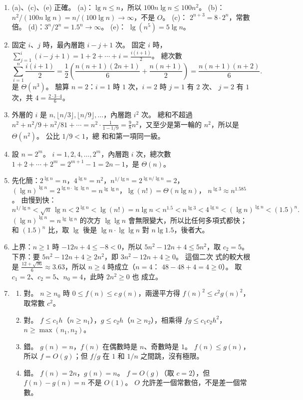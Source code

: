 \begin{enumerate}
\item (a)、(c)、(e) 正確。 (a)：$\lg n \le n$，所以 $100n\lg n \le 100n^2$。
(b)：$n^2 / (100 n \lg n) = n / (100 \lg n) \to \infty$，不是 $O$。 (c)：
$2^{n+3} = 8 \cdot 2^n$，常數倍。 (d)：$3^n / 2^n = 1.5^n \to \infty$。 (e)：
$\lg(n^5) = 5\lg n$。

\item 固定 $i$、$j$ 時，最內層跑 $i - j + 1$ 次。 固定 $i$ 時，
$\sum_{j=1}^{i} (i - j + 1) = 1 + 2 + \cdots + i = \frac{i(i+1)}{2}$。 總次數
\[
\sum_{i=1}^{n} \frac{i(i+1)}{2}
= \frac{1}{2}\left(\frac{n(n+1)(2n+1)}{6} + \frac{n(n+1)}{2}\right)
= \frac{n(n+1)(n+2)}{6}.
\]
是 $\Theta(n^3)$。 驗算 $n = 2$：$i = 1$ 時 $1$ 次，$i = 2$ 時 $j = 1$ 有 $2$ 次、
$j = 2$ 有 $1$ 次，共 $4 = \frac{2 \cdot 3 \cdot 4}{6}$。

\item 外層的 $i$ 是 $n, \lfloor n/3 \rfloor, \lfloor n/9 \rfloor, \ldots$，內層跑
$i^2$ 次。 總和不超過 $n^2 + n^2/9 + n^2/81 + \cdots = n^2 \cdot \frac{1}{1 - 1/9} =
\frac{9}{8}n^2$，又至少是第一輪的 $n^2$，所以是 $\Theta(n^2)$。 公比 $1/9 < 1$，總
和和第一項同一級。

\item 設 $n = 2^m$。 $i = 1, 2, 4, \ldots, 2^m$，內層跑 $i$ 次，總次數
$1 + 2 + \cdots + 2^m = 2^{m+1} - 1 = 2n - 1$，是 $\Theta(n)$。

\item 先化簡：$2^{\lg n} = n$，$4^{\lg n} = n^2$，$n^{1/\lg n} = 2^{\lg n / \lg n} = 2$，
$(\lg n)^{\lg n} = 2^{\lg n \cdot \lg\lg n} = n^{\lg \lg n}$，$\lg(n!) = \Theta(n \lg n)$，
$n^{\lg 3} \approx n^{1.585}$。 由慢到快：
\[
n^{1/\lg n} < \sqrt{n}\,\lg n < 2^{\lg n} < \lg(n!) = n\lg n < n^{1.5} < n^{\lg 3}
< 4^{\lg n} < (\lg n)^{\lg n} < (1.5)^n.
\]
$(\lg n)^{\lg n} = n^{\lg\lg n}$ 的次方 $\lg \lg n$ 會無限變大，所以比任何多項式都快；
和 $(1.5)^n$ 比，取 $\lg$ 後是 $\lg n \cdot \lg \lg n$ 對 $n \lg 1.5$，後者大。

\item 上界：$n \ge 1$ 時 $-12n + 4 \le -8 < 0$，所以 $5n^2 - 12n + 4 \le 5n^2$，取
$c_2 = 5$。 下界：要 $5n^2 - 12n + 4 \ge 2n^2$，即 $3n^2 - 12n + 4 \ge 0$。 這個二次
式的較大根是 $\frac{12 + \sqrt{96}}{6} \approx 3.63$，所以 $n \ge 4$ 時成立（$n = 4$：
$48 - 48 + 4 = 4 \ge 0$）。 取 $c_1 = 2$、$c_2 = 5$、$n_0 = 4$，此時 $2n^2 \ge 0$ 也
成立。

\item
\begin{enumerate}
\item 對。 $n \ge n_0$ 時 $0 \le f(n) \le c\,g(n)$，兩邊平方得
$f(n)^2 \le c^2 g(n)^2$，取常數 $c^2$。
\item 對。 $f \le c_1 h$（$n \ge n_1$），$g \le c_2 h$（$n \ge n_2$），相乘得
$fg \le c_1 c_2 h^2$，$n \ge \max(n_1, n_2)$。
\item 錯。 $g(n) = n$，$f(n)$ 在偶數時是 $n$、奇數時是 $1$。 $f(n) \le g(n)$，所以
$f = O(g)$；但 $f/g$ 在 $1$ 和 $1/n$ 之間跳，沒有極限。
\item 錯。 $f(n) = 2n$，$g(n) = n$。 $f = O(g)$（取 $c = 2$），但 $f(n) - g(n) = n$
不是 $O(1)$。 $O$ 允許差一個常數倍，不是差一個常數。
\end{enumerate}


\end{enumerate}
